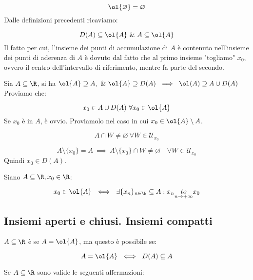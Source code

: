 \documentclass[../analisi.tex]{subfiles}
\begin{document}
\begin{equation} 
	\ol{\varnothing} = \varnothing
\end{equation}
Dalle definizioni precedenti ricaviamo:


\begin{equation}
	D(A) \subseteq \ol{A}\ \&\ A \subseteq \ol{A}
\end{equation}
Il fatto per cui, l'insieme dei punti di accumulazione di $A$ è contenuto
nell'insieme dei punti di aderenza di $A$ è dovuto dal fatto che al primo insieme
"togliamo" $x_0$, ovvero il centro dell'intervallo di riferimento, mentre
fa parte del secondo.


\begin{defn}[ $ \ol{A} = A \cup D(A) $ ]
Sia $\acr$, si ha $\ol{A} \supseteq A,\ \&\ \ol{A} \supseteq D(A) 
\ \implies\ \ol(A) \supseteq A \cup D(A)$\\
Proviamo che:


\begin{equation}
	x_0 \in A \cup D(A)\ \forall x_0 \in \ol{A}
\end{equation}
Se $x_0$ è in $A$, è ovvio. Proviamolo nel caso in cui $x_0 \in \ol{A} \setminus A$.


\begin{equation}
	A \cap W \neq \varnothing\ \forall W \in \mathcal{U}_{x_0}
\end{equation}
\bda


\begin{equation} 
	A \setminus \{ x_0 \} = A\ \implies\ A \setminus \{ x_0 \} \cap W
	\neq \varnothing \quad \forall W \in \mathcal{U}_{x_0}
\end{equation}
Quindi $x_0 \in D(A)$.
\end{defn}


\begin{defn}
Siano $ \acr , x_0 \in \R$:

\begin{equation}
	x_0 \in \ol{A}\ \iff\ \exists \{ x_n \}_{n \in \N} \subseteq
	A : x_n \underset{\nti}{to} x_0
\end{equation}
\end{defn}


\subsection{Insiemi aperti e chiusi. Insiemi compatti}

\begin{defn}
$\acr$ è  se $A = \ol{A}$, ma questo è possibile se:


\begin{equation}
	A = \ol{A}\ \iff\ D(A) \subseteq A
\end{equation}
\end{defn}
Se $\acr$ sono valide le seguenti affermazioni:
\end{document}
